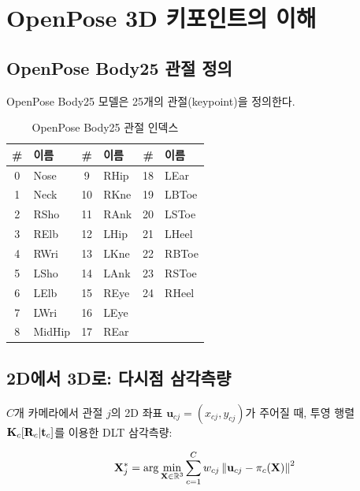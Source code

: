 \documentclass[11pt, a4paper]{report}
\begin{document}
\chapter{OpenPose 3D 키포인트의 이해}
\label{ch:openpose3d}

\section{OpenPose Body25 관절 정의}

OpenPose Body25 모델은 25개의 관절(keypoint)을 정의한다.

\begin{table}[H]
\centering
\caption{OpenPose Body25 관절 인덱스}
\renewcommand{\arraystretch}{1.2}
\small
\begin{tabular}{cl|cl|cl}
\toprule
\textbf{\#} & \textbf{이름} & \textbf{\#} & \textbf{이름} & \textbf{\#} & \textbf{이름} \\
\midrule
0 & Nose & 9 & RHip & 18 & LEar \\
1 & Neck & 10 & RKne & 19 & LBToe \\
2 & RSho & 11 & RAnk & 20 & LSToe \\
3 & RElb & 12 & LHip & 21 & LHeel \\
4 & RWri & 13 & LKne & 22 & RBToe \\
5 & LSho & 14 & LAnk & 23 & RSToe \\
6 & LElb & 15 & REye & 24 & RHeel \\
7 & LWri & 16 & LEye & & \\
8 & MidHip & 17 & REar & & \\
\bottomrule
\end{tabular}
\end{table}


\section{2D에서 3D로: 다시점 삼각측량}

$C$개 카메라에서 관절 $j$의 2D 좌표 $\mathbf{u}_{cj} = (x_{cj}, y_{cj})$가 주어질 때,
투영 행렬 $\mathbf{K}_c[\mathbf{R}_c | \mathbf{t}_c]$를 이용한 DLT 삼각측량:

\begin{equation}
\mathbf{X}_j^* = \arg\min_{\mathbf{X} \in \mathbb{R}^3}
  \sum_{c=1}^{C} w_{cj} \left\| \mathbf{u}_{cj} - \pi_c(\mathbf{X}) \right\|^2
\end{equation}
\end{document}
